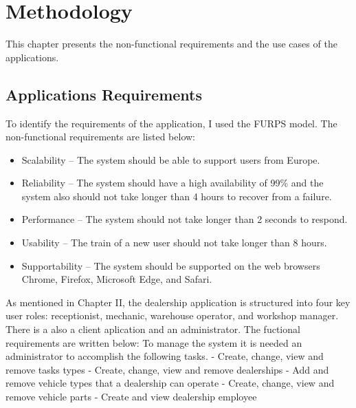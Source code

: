 \chapter{Methodology}%
\label{chapter:methodology}

\begin{introduction}
This chapter presents the non-functional requirements and the use cases of the applications. 
\end{introduction} 




\section{Applications Requirements} 


To identify the requirements of the application, I used the FURPS model. 
The non-functional requirements are listed below:

\begin{itemize}
  \item Scalability – The system should be able to support users from Europe.
  \item Reliability – The system should have a high availability of 99\% and the system also should not take longer than 4 hours to recover from a failure.
  \item Performance – The system should not take longer than 2 seconds to respond.
  \item Usability – The train of a new user should not take longer than 8 hours.
  \item Supportability – The system should be supported on the web browsers Chrome, Firefox, Microsoft Edge, and Safari.
\end{itemize}

As mentioned in Chapter II, the dealership application is structured into four key user roles: receptionist, mechanic, warehouse operator, and workshop manager.
There is a also a client aplication and an administrator.
The fuctional requirements are written below:
To manage the system it is needed an administrator to accomplish the following tasks.
- Create, change, view and remove tasks types
- Create, change, view and remove dealerships
  - Add and remove vehicle types that a dealership can operate
- Create, change, view and remove vehicle parts
- Create and view dealership employee

